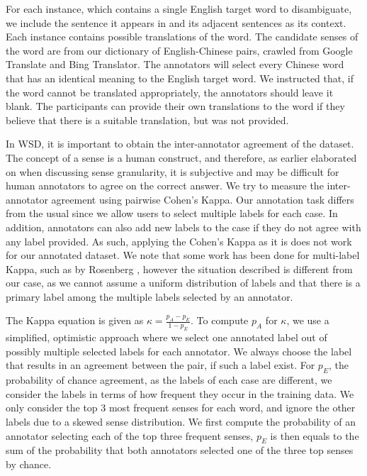 \documentclass[11pt]{article}
\begin{document}
For each instance, which contains a single English target word to disambiguate, we include the sentence it appears in and its adjacent sentences as its context. Each instance contains possible translations of the word. The candidate senses of the word are from our dictionary of English-Chinese pairs, crawled from Google Translate and Bing Translator. The annotators will select every Chinese word that has an identical meaning to the English target word. We instructed that, if the word cannot be translated appropriately, the annotators should leave it blank. The participants can provide their own translations to the word if they believe that there is a suitable translation, but was not provided. 


In WSD, it is important to obtain the inter-annotator agreement of the dataset. The concept of a sense is a human construct, and therefore, as earlier elaborated on when discussing sense granularity, it is subjective and may be difficult for human annotators to agree on the correct answer. We try to measure the inter-annotator agreement using pairwise Cohen's Kappa. Our annotation task differs from the usual since we allow users to select multiple labels for each case. In addition, annotators can also add new labels to the case if they do not agree with any label provided. As such, applying the Cohen's Kappa as it is does not work for our annotated dataset. We note that some work has been done for multi-label Kappa, such as by Rosenberg , however the situation described  is different from our case, as we cannot assume a uniform distribution of labels and that there is a primary label among the multiple labels selected by an annotator. 

The Kappa equation is given as 
$\kappa = \frac{p_A - p_E}{1 - p_E} $.
To compute $p_A$ for $\kappa$, we use a simplified, optimistic approach where we select one annotated label out of possibly multiple selected labels for each annotator. We always choose the label that results in an agreement between the pair, if such a label exist. For $p_E$, the probability of chance agreement, as the labels of each case are different, we consider the labels in terms of how frequent they occur in the training data. We only consider the top 3 most frequent senses for each word, and ignore the other labels due to a skewed sense distribution. We first compute the probability of an annotator selecting each of the top three frequent senses, $p_E$ is then equals to the sum of the probability that both annotators selected one of the three top senses by chance. 
\end{document}
